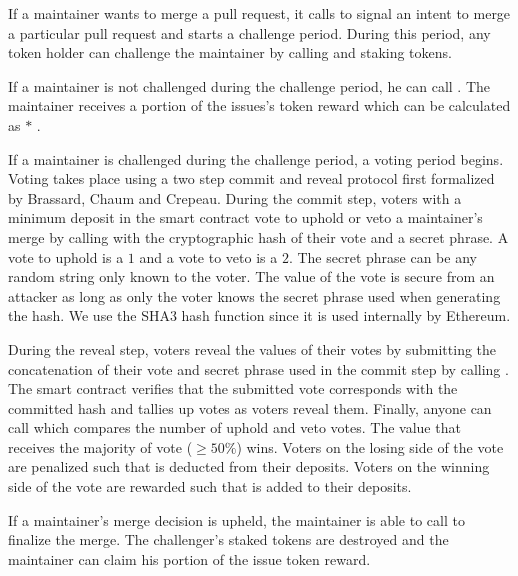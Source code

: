 If a maintainer wants to merge a pull request, it calls
 to signal an intent to merge a particular pull
request and starts a challenge period. During this period, any token holder can
challenge the maintainer by calling  and staking
 tokens.

If a maintainer is not challenged during the challenge period, he can call
. The maintainer receives a portion of the
issues's token reward which can be calculated as  $*$ .

If a maintainer is challenged during the challenge period, a voting
period begins. Voting takes place using a two step commit and reveal protocol
first formalized by Brassard, Chaum and Crepeau\cite{proofsofknowledge}. During
the commit step, voters with a minimum  deposit in the
smart contract vote to uphold or veto a maintainer's merge by calling
 with the cryptographic hash of their vote and a secret
phrase. A vote to uphold is a $1$ and a vote to veto is a $2$. The secret phrase
can be any random string only known to the voter. The value of the vote is
secure from an attacker as long as only the voter knows the secret phrase used
when generating the hash. We use the SHA3  hash function
since it is used internally by Ethereum.

During the reveal step, voters reveal the values of their votes by submitting
the concatenation of their vote and secret phrase used in the commit step by
calling . The smart contract verifies that the
submitted vote corresponds with the committed hash and tallies up votes as
voters reveal them. Finally, anyone can call  which
compares the number of uphold and veto votes. The value that receives the
majority of vote ($\geq 50\%$) wins. Voters on the losing side of the vote are
penalized such that  is deducted from their
deposits. Voters on the winning side of the vote are rewarded such that
 is added to their deposits.

If a maintainer's merge decision is upheld, the maintainer is able to call
 to finalize the merge. The challenger's
 staked tokens are destroyed and the maintainer can
claim his portion of the issue token reward.

